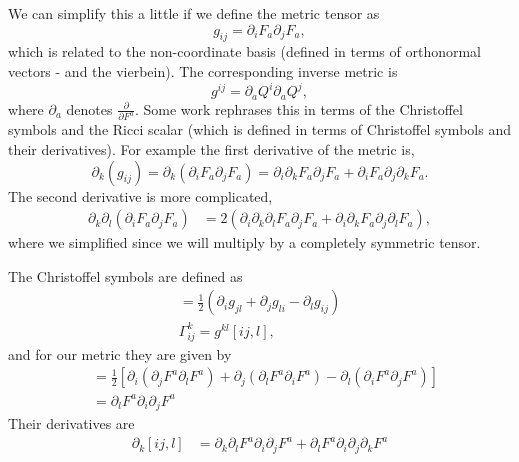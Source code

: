 We can simplify this a little if we define the metric tensor as
\begin{equation}
  g_{ij} = \partial_iF_a\partial_jF_a,
\end{equation}
which is related to the non-coordinate basis (defined in terms of orthonormal
vectors - and the vierbein).
The corresponding inverse metric is 
\begin{equation}
  g^{ij} = \partial_aQ^i\partial_aQ^j,
\end{equation}
where $\partial_a$ denotes $\frac{\partial}{\partial F^a}$.
Some work rephrases this in terms of the Christoffel symbols and the Ricci
scalar (which is defined in terms of Christoffel symbols and their derivatives).
For example the first derivative of the metric is, 
\begin{equation}
\partial_k(g_{ij})=\partial_k(\partial_iF_a\partial_jF_a) =
 \partial_i\partial_kF_a\partial_jF_a+\partial_iF_a\partial_j\partial_kF_a.
\end{equation}
The second derivative is more complicated, 
\begin{align}
\partial_{k}\partial_l(\partial_iF_a\partial_jF_a) 
&=2(\partial_i\partial_k\partial_lF_a\partial_jF_a+\partial_i\partial_kF_a\partial_j\partial_lF_a),
\end{align}
where we simplified since we will multiply by a completely symmetric tensor.    

The Christoffel symbols are defined as
\begin{gather}
  [ij,l]=\frac{1}{2}(\partial_ig_{jl}+\partial_jg_{li}-\partial_lg_{ij})\\
  \Gamma_{ij}^k = g^{kl}[ij,l],
\end{gather}
and for our metric they are given by 
\begin{align}
  [ij,l]&=\frac{1}{2}[\partial_i(\partial_jF^a\partial_l F^a)
  +\partial_j(\partial_lF^a\partial_i F^a)
  -\partial_l(\partial_iF^a\partial_j F^a)]\\
  &= \partial_lF^a\partial_i\partial_j F^a
\end{align}
Their derivatives are
\begin{align}
 \partial_k[ij,l] &= \partial_k\partial_lF^a\partial_i\partial_j F^a 
+ \partial_lF^a\partial_i\partial_j\partial_k F^a
\end{align}

